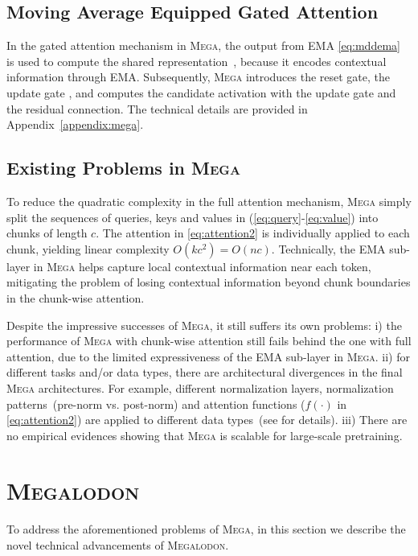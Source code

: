 \subsection{Moving Average Equipped Gated Attention} In the gated attention mechanism in \textsc{Mega}, the output from EMA \eqref{eq:mddema} is used to compute the shared representation~\citep{hua2022transformer}, because it encodes contextual information through EMA. Subsequently, \textsc{Mega} introduces the reset gate, the update gate , and computes the candidate activation with the update gate and the residual connection. The technical details are provided in Appendix~\ref{appendix:mega}.

\subsection{Existing Problems in \textsc{Mega}}
To reduce the quadratic complexity in the full attention mechanism, \textsc{Mega} simply split the sequences of queries, keys and values in (\ref{eq:query}-\ref{eq:value}) into chunks of length $c$. The attention in \eqref{eq:attention2} is individually applied to each chunk, yielding linear complexity $O(kc^2)=O(nc)$. Technically, the EMA sub-layer in \textsc{Mega} helps capture local contextual information near each token, mitigating the problem of losing contextual information beyond chunk boundaries in the chunk-wise attention.

Despite the impressive successes of \textsc{Mega}, it still suffers its own problems: i) the performance of \textsc{Mega} with chunk-wise attention still fails behind the one with full attention, due to the limited expressiveness of the EMA sub-layer in \textsc{Mega}. 
ii) for different tasks and/or data types, there are architectural divergences in the final \textsc{Mega} architectures. For example, different normalization layers, normalization patterns~(pre-norm vs. post-norm) and attention functions ($f(\cdot)$ in \eqref{eq:attention2}) are applied to different data types~(see \citet{ma2023mega} for details). iii) There are no empirical evidences showing that \textsc{Mega} is scalable for large-scale pretraining.

\section{\textsc{Megalodon}}
\label{sec:mega2}
To address the aforementioned problems of \textsc{Mega}, in this section we describe the novel technical advancements of \textsc{Megalodon}.

